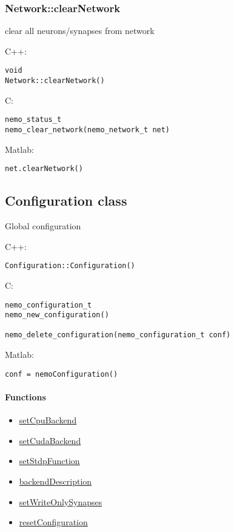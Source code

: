 \clearpage
\subsubsection*{Network::clearNetwork}
\label{fn: clearNetwork}
clear all neurons/synapses from network


\noindent C++:
\begin{lstlisting}[aboveskip=2pt]
void
Network::clearNetwork()
\end{lstlisting}

\noindent C:
\begin{lstlisting}[aboveskip=2pt]
nemo_status_t
nemo_clear_network(nemo_network_t net)
\end{lstlisting}

\noindent Matlab:
\begin{lstlisting}[aboveskip=2pt]
net.clearNetwork()
\end{lstlisting}

\clearpage
\subsection{Configuration class}
\label{Configuration}
Global configuration

\noindent C++:
\begin{lstlisting}[aboveskip=2pt]
Configuration::Configuration()
\end{lstlisting}

\noindent C:
\begin{lstlisting}[aboveskip=2pt]
nemo_configuration_t
nemo_new_configuration()
 
nemo_delete_configuration(nemo_configuration_t conf)
\end{lstlisting}

\noindent Matlab:
\begin{lstlisting}[aboveskip=2pt]
conf = nemoConfiguration()
\end{lstlisting}
\paragraph{Functions}
\begin{itemize}
\item \hyperref[fn: setCpuBackend]{setCpuBackend}
\item \hyperref[fn: setCudaBackend]{setCudaBackend}
\item \hyperref[fn: setStdpFunction]{setStdpFunction}
\item \hyperref[fn: backendDescription]{backendDescription}
\item \hyperref[fn: setWriteOnlySynapses]{setWriteOnlySynapses}
\item \hyperref[fn: resetConfiguration]{resetConfiguration}
\end{itemize}
\clearpage
